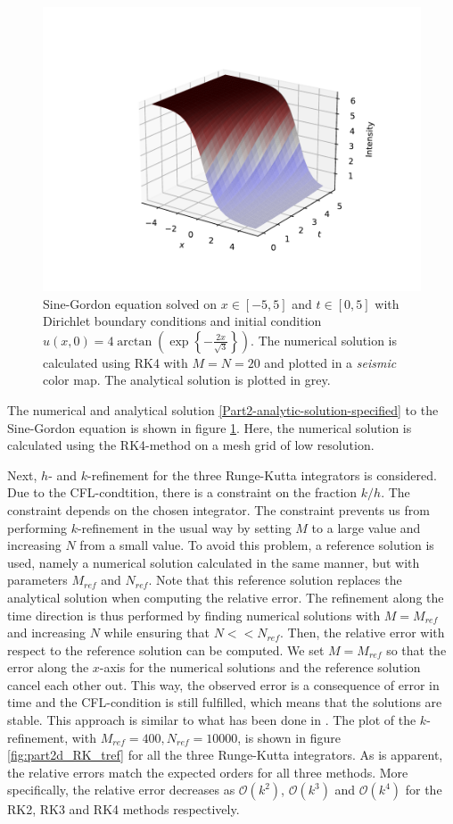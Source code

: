 \begin{figure}[t]
    \centering
    \includegraphics[width = 0.85\linewidth]{plots/part2d_sol.pdf}
    \caption{Sine-Gordon equation solved on $x \in [-5,5]$ and $t \in [0,5]$ with Dirichlet boundary conditions and initial condition $u(x,0)=4\arctan{\left( \exp{\left\{-\frac{2x}{\sqrt{3}}\right\}} \right)}$. The numerical solution is calculated using RK4 with $M=N=20$ and plotted in a \textit{seismic} color map. The analytical solution is plotted in grey.}
    \label{fig:part2d_sol}
\end{figure}

The numerical and analytical solution \eqref{Part2-analytic-solution-specified} to the Sine-Gordon equation is shown in figure \ref{fig:part2d_sol}. Here, the numerical solution is calculated using the RK4-method on a mesh grid of low resolution. 

Next, $h$- and $k$-refinement for the three Runge-Kutta integrators is considered. Due to the CFL-condtition, there is a constraint on the fraction $k/h$. The constraint depends on the chosen integrator. The constraint prevents us from performing $k$-refinement in the usual way by setting $M$ to a large value and increasing $N$ from a small value. To avoid this problem, a reference solution is used, namely a numerical solution calculated in the same manner, but with parameters $M_{ref}$ and $N_{ref}$. Note that this reference solution replaces the analytical solution when computing the relative error. The refinement along the time direction is thus performed by finding numerical solutions with $M=M_{ref}$ and increasing $N$ while ensuring that $N<<N_{ref}$. Then, the relative error with respect to the reference solution can be computed. We set $M=M_{ref}$ so that the error along the $x$-axis for the numerical solutions and the reference solution cancel each other out. This way, the observed error is a consequence of error in time and the CFL-condition is still fulfilled, which means that the solutions are stable. This approach is similar to what has been done in \cite{LOVE201333}. The plot of the $k$-refinement, with $M_{ref}=400, N_{ref}=10000$, is shown in figure \ref{fig:part2d_RK_tref} for all the three Runge-Kutta integrators. As is apparent, the relative errors match the expected orders for all three methods. More specifically, the relative error decreases as $\mathcal{O}(k^2)$, $\mathcal{O}(k^3)$ and $\mathcal{O}(k^4)$ for the RK2, RK3 and RK4 methods respectively. 

